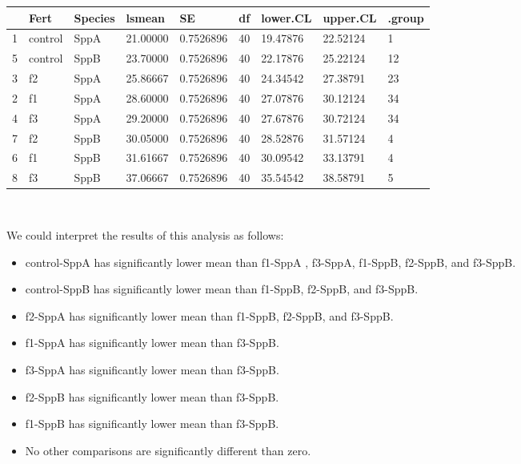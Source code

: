 \documentclass[11pt]{article}
\begin{document}
    \begin{tabular}{|r|l|l|l|l|l|l|l|l|}
  & Fert & Species & lsmean & SE & df & lower.CL & upper.CL & .group\\
\hline
	1 & control   & SppA      & 21.00000  & 0.7526896 & 40        & 19.47876  & 22.52124  &  1       \\
	5 & control   & SppB      & 23.70000  & 0.7526896 & 40        & 22.17876  & 25.22124  &  12      \\
	3 & f2        & SppA      & 25.86667  & 0.7526896 & 40        & 24.34542  & 27.38791  &   23     \\
	2 & f1        & SppA      & 28.60000  & 0.7526896 & 40        & 27.07876  & 30.12124  &    34    \\
	4 & f3        & SppA      & 29.20000  & 0.7526896 & 40        & 27.67876  & 30.72124  &    34    \\
	7 & f2        & SppB      & 30.05000  & 0.7526896 & 40        & 28.52876  & 31.57124  &     4    \\
	6 & f1        & SppB      & 31.61667  & 0.7526896 & 40        & 30.09542  & 33.13791  &     4    \\
	8 & f3        & SppB      & 37.06667  & 0.7526896 & 40        & 35.54542  & 38.58791  &      5   \\
\end{tabular}


    
    
    
    \begin{center}
    \end{center}
    { \hspace*{\fill} \\}
    
    We could interpret the results of this analysis as follows: 
    \begin{itemize}
    	\item control-SppA has significantly lower mean than f1-SppA , f3-SppA,
    	f1-SppB, f2-SppB, and f3-SppB.
    	\item control-SppB has significantly lower
    	mean than f1-SppB, f2-SppB, and f3-SppB.
    	\item f2-SppA has significantly
    	lower mean than f1-SppB, f2-SppB, and f3-SppB.
    	\item f1-SppA has
    	significantly lower mean than f3-SppB.
    	\item f3-SppA has significantly lower
    	mean than f3-SppB.
    	\item  f2-SppB has significantly lower mean than f3-SppB.
    	\item  f1-SppB has significantly lower mean than f3-SppB.
    	\item  No other
    	comparisons are significantly different than zero.
    \end{itemize}
    
\end{document}
